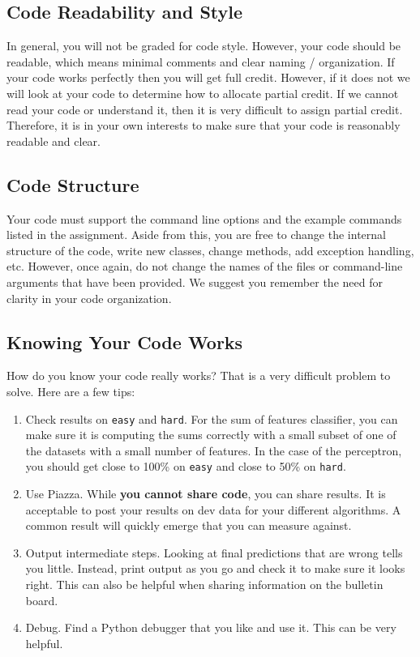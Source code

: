 \documentclass[11pt]{article}
\begin{document}
	\subsection{Code Readability and Style}
	In general, you will not be graded for code style. However, your code should be readable, which means minimal comments and clear naming / organization. If your code works perfectly then you will get full credit. However, if it does not we will look at your code to determine how to allocate partial credit. If we cannot read your code or understand it, then it is very difficult to assign partial credit. Therefore, it is in your own interests to make sure that your code is reasonably readable and clear.
	
	\subsection{Code Structure}
	Your code must support the command line options and the example commands listed in the assignment. Aside from this, you are free to change the internal structure of the code, write new classes, change methods, add exception handling, etc. However, once again, do not change the names of the files or command-line arguments that have been provided. We suggest you remember the need for clarity in your code organization.
	
\subsection{Knowing Your Code Works}
	How do you know your code really works? That is a very difficult problem to solve. Here are a few tips:
	\begin{enumerate}
		\item Check results on {\tt easy} and {\tt hard}. For the sum of features classifier, you can make sure it is computing the sums correctly with a small subset of one of the datasets with a small number of features. In the case of the perceptron, you should get close to 100\% on \texttt{easy} and close to 50\% on \texttt{hard}.
		\item Use Piazza. While \textbf{you cannot share code}, you can share results. It is acceptable to post your results on dev data for your different algorithms. A common result will quickly emerge that you can measure against.
		\item Output intermediate steps. Looking at final predictions that are wrong tells you little. Instead, print output as you go and check it to make sure it looks right. This can also be helpful when sharing information on the bulletin board.
		\item Debug. Find a Python debugger that you like and use it. This can be very helpful.
	\end{enumerate}
	
\end{document}
